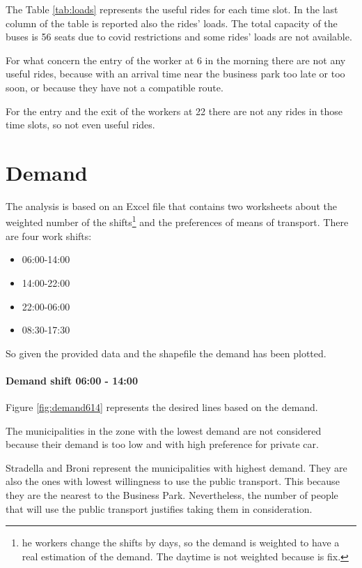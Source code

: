 The Table \ref{tab:loads} represents the useful rides for each time slot. In the last column of the table is reported also the rides’ loads. The total capacity of the buses is 56 seats due to covid restrictions and some rides’ loads are not available.

For what concern the entry of the worker at 6 in the morning there are not any useful rides, because with an arrival time near the business park too late or too soon, or because they have not a compatible route.

For the entry and the exit of the workers at 22 there are not any rides in those time slots, so not even useful rides.
\newpage

\newpage
\section{Demand}

The analysis is based on an Excel file that contains two worksheets about the weighted number of the shifts\footnote{he workers change the shifts by days, so the demand is weighted to have a real estimation of the demand. The daytime is not weighted because is fix.}  and the preferences of means of transport.
There are four work shifts:

\begin{itemize}
    \item 06:00-14:00
    \item 14:00-22:00
    \item 22:00-06:00
    \item 08:30-17:30
\end{itemize}
So given the provided data and the shapefile \cite{Istat2022CONFINI2022} the demand has been plotted.

\paragraph{Demand shift 06:00 - 14:00}

Figure \ref{fig:demand614} represents the desired lines based on the demand.

The municipalities in the zone with the lowest demand are not considered because their demand is too low and with high preference for private car.

Stradella and Broni represent the municipalities with highest demand. They are also the ones with lowest willingness to use the public transport. This because they are the nearest to the Business Park. Nevertheless, the number of people that will use the public transport justifies taking them in consideration. 

